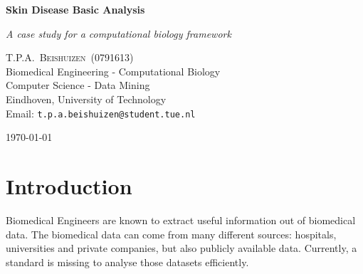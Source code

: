 \documentclass[10pt,a4paper]{article}
\newcommand{\documenttitle}{Skin Disease Basic Analysis}
\newcommand{\documentsubtitle}{A case study for a computational biology framework}
\begin{document}
	
	\begin{titlepage}
		
		\center
		
		\vspace*{3cm}
		
		\textbf{\huge \documenttitle}
		
		\textit{\LARGE \documentsubtitle}
		
		\vspace*{2cm}
		
		\large
		\centering
		T.P.A.~\textsc{Beishuizen}~(0791613)\\
		Biomedical Engineering - Computational Biology\\
		Computer Science - Data Mining\\
		Eindhoven, University of Technology\\
		Email: \texttt{t.p.a.beishuizen@student.tue.nl}
		
		\vfill
		
		\vspace*{1cm}
		
		\today
		
	\end{titlepage}
	
	\tableofcontents
	
	
	\pagestyle{fancy}
	\fancyhead{} %
	\fancyfoot{} %
	\renewcommand{\headrulewidth}{0.4pt}
	\renewcommand{\footrulewidth}{0.4pt}
	
	\fancyhead[L]{\rightmark}
	\fancyfoot[C]{\thepage}
	
	
	\clearpage
	
	\section{Introduction}
	\label{sec:Introduction}
	
	Biomedical Engineers are known to extract useful information out of biomedical data. The biomedical data can come from many different sources: hospitals, universities and private companies, but also publicly available data. Currently, a standard is missing to analyse those datasets efficiently. 
\end{document}
